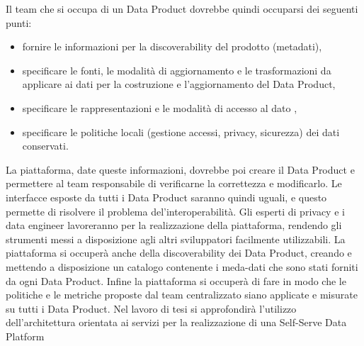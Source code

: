 \documentclass[a4paper,12pt]{report}
\begin{document}
Il team che si occupa di un Data Product dovrebbe quindi occuparsi dei seguenti punti:
\begin{itemize}
    \item fornire le informazioni per la discoverability del prodotto (metadati),
    \item specificare le fonti, le modalità di aggiornamento e le trasformazioni da applicare ai dati per la costruzione e l'aggiornamento del Data Product,
    \item specificare le rappresentazioni e le modalità di accesso al dato ,
    \item specificare le politiche locali (gestione accessi, privacy, sicurezza) dei dati conservati.
\end{itemize}
La piattaforma, date queste informazioni, dovrebbe poi creare il Data Product e permettere al team responsabile di verificarne la correttezza e modificarlo. 
Le interfacce esposte da tutti i Data Product saranno quindi uguali, e questo permette di risolvere il problema del'interoperabilità.
Gli esperti di privacy e i data engineer lavoreranno per la realizzazione della piattaforma, rendendo gli strumenti messi a disposizione agli altri sviluppatori facilmente utilizzabili.
La piattaforma si occuperà anche della discoverability dei Data Product, creando e mettendo a disposizione un catalogo contenente i meda-dati che sono stati forniti da ogni Data Product.
Infine la piattaforma si occuperà di fare in modo che le politiche e le metriche proposte dal team centralizzato siano applicate e misurate su tutti i Data Product.
Nel lavoro di tesi si approfondirà l'utilizzo dell'architettura orientata ai servizi per la realizzazione di una Self-Serve Data Platform
\end{document}
